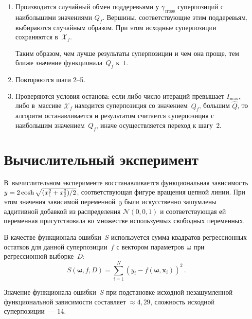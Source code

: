 \begin{multicols}{2}
\begin{enumerate}
 
  
  
  \item Производится случайный обмен поддеревьями у $\gamma_{\mathrm{cross}}$ суперпозиций
    с наибольшими значениями $Q_f$. Вершины, соответствующие этим поддеревьям,
    выбираются случайным образом. При этом исходные суперпозиции сохраняются
    в~$\mathcal{X}_f$.
    

Таким образом, чем лучше результаты суперпозиции и чем она проще, тем ближе
значение функционала~$Q_f$ к~$1$.


  \item Повторяются шаги 2--5.
  \item Проверяются условия останова: если либо чис\-ло итераций превышает
    $I_{\max}$, либо в~массиве $\mathcal{X}_f$ находится суперпозиция со значением~$Q_f$, 
    большим $\hat{Q}$, то алгоритм останавливается
    и результатом считается суперпозиция с наибольшим значением~$Q_f$, иначе
    осуществляется переход к шагу~2.
\end{enumerate}

\section{Вычислительный эксперимент}

В~вычислительном эксперименте вос\-ста\-нав\-ли\-ва\-ет\-ся функциональная зависимость
$y \hm= 2 \cosh \sqrt{(x_1^2\hm + x_2^2)/2}$, соответствующая фигуре вращения
цепной линии. При этом значения зависимой
переменной~$y$ были искусственно зашумлены аддитивной добавкой из
распределения $\mathcal{N} (0, 0{,}1)$ и соответствующая ей переменная
присутствовала во множестве используемых свободных переменных.

В качестве функционала ошибки~$S$ используется сумма квадратов
регрессионных остатков для данной суперпозиции~$f$ с вектором параметров
$\boldsymbol{\omega}$ при регрессионной выборке~$D$:
\begin{equation}
  \label{eq:sse_expr}
  S(\boldsymbol{\omega}, f, D) = \sum\limits_{i=1}^N (y_i - f (\boldsymbol{\omega}, 
  \mathbf{x}_i))^2\,.
\end{equation}

Значение функционала ошибки~$S$ при подстановке исходной незашумленной
функциональной зависимости составляет $\approx 4{,}29$, сложность исходной
суперпозиции~--- 14.

\begin{table*}\small
\begin{center}
  \label{tabl:results}
  \vspace*{2ex}


\end{center}
\end{table*}
\end{multicols}
